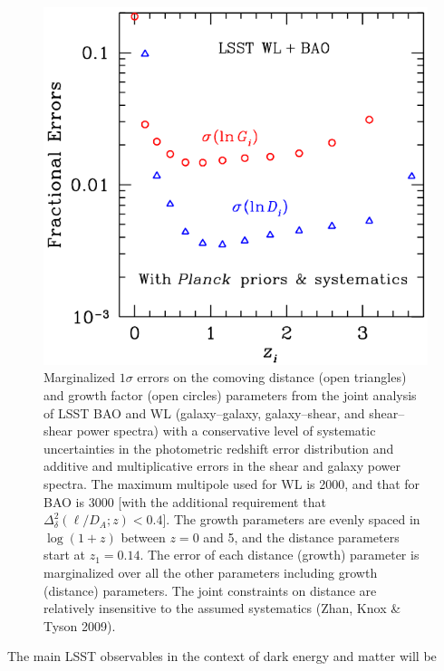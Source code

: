 \documentclass{emulateapj}
\begin{document}
\begin{figure}
\includegraphics[width=1.0\hsize,clip]{dges.pdf}
\caption{Marginalized $1\sigma$ errors on the comoving distance 
(open triangles) and growth factor (open circles) parameters from 
the joint analysis of LSST BAO and WL (galaxy--galaxy, galaxy--shear,
and shear--shear power spectra) with a 
conservative level of systematic uncertainties in the photometric redshift error 
distribution and additive and multiplicative errors in the shear and 
galaxy power spectra. The maximum multipole used for WL is 
2000, and that for BAO is 3000 [with the additional requirement that 
$\Delta_\delta^2(\ell/D_{A};z) < 0.4$].
The growth parameters
are evenly spaced in 
$\log(1+z)$ between $z = 0$ and 5, and the distance parameters
start at $z_1 = 0.14$.
The error of each distance (growth) parameter is marginalized 
over all the other parameters including growth (distance) parameters. The joint constraints on 
distance are relatively insensitive to the assumed systematics
(Zhan, Knox \& Tyson 2009).} 
\label{Fig:bao2}
\end{figure}


The main LSST observables in the context of dark energy and matter will be
\end{document}
